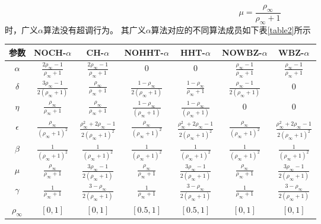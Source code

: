 \begin{equation}
\mu=\frac{\rho_{\infty}}{\rho_{\infty}+1}
\end{equation}
时，广义$\alpha$算法没有超调行为。
{}
其广义$\alpha$算法对应的不同算法成员如下表\ref{table2}所示
\begin{table}[htbp]
\vspace{0.5em}\centering\wuhao
\begin{tabular}{ccccccc}
\toprule[1.5pt]
参数 & NOCH-$\alpha$ & CH-$\alpha$ & NOHHT-$\alpha$ & HHT-$\alpha$ & NOWBZ-$\alpha$ & WBZ-$\alpha$\\
\midrule[1pt]
$\alpha$ & $\frac{2\rho_{\infty}-1}{\rho_{\infty}+1}$ & $\frac{2\rho_{\infty}-1}{\rho_{\infty}+1}$ & $0$ & $0$ & $\frac{\rho_{\infty}-1}{\rho_{\infty}+1}$ & $\frac{\rho_{\infty}-1}{\rho_{\infty}+1}$\\ [0.5em]
$\delta$ & $\frac{3\rho_{\infty}-1}{2(\rho_{\infty}+1)}$ & $\frac{\rho_{\infty}}{\rho_{\infty}+1}$ & $\frac{1-\rho_{\infty}}{2(\rho_{\infty}+1)}$ & $\frac{1-\rho_{\infty}}{\rho_{\infty}+1}$ & $\frac{\rho_{\infty}-1}{2(\rho_{\infty}+1)}$ & $0$\\ [0.5em]
$\eta$ & $\frac{\rho_{\infty}}{\rho_{\infty}+1}$ & $\frac{\rho_{\infty}}{\rho_{\infty}+1}$ & $\frac{1-\rho_{\infty}}{(\rho_{\infty}+1)}$ & $\frac{1-\rho_{\infty}}{(\rho_{\infty}+1)}$ & $0$ & $0$\\ [0.5em]
$\epsilon$ & $\frac{\rho_{\infty}}{(\rho_{\infty}+1)^2}$ & $\frac{\rho_{\infty}^2+2\rho_{\infty}-1}{2(\rho_{\infty}+1)^2}$ & $\frac{\rho_{\infty}}{(\rho_{\infty}+1)^2}$ & $\frac{\rho_{\infty}^2+2\rho_{\infty}-1}{2(\rho_{\infty}+1)^2}$ & $\frac{\rho_{\infty}}{(\rho_{\infty}+1)^2}$ & $\frac{\rho_{\infty}^2+2\rho_{\infty}-1}{2(\rho_{\infty}+1)^2}$\\ [0.5em]
$\beta$ & $\frac{1}{(\rho_{\infty}+1)^2}$ & $\frac{1}{(\rho_{\infty}+1)^2}$ & $\frac{1}{(\rho_{\infty}+1)^2}$ & $\frac{1}{(\rho_{\infty}+1)^2}$ & $\frac{1}{(\rho_{\infty}+1)^2}$ & $\frac{1}{(\rho_{\infty}+1)^2}$\\ [0.5em]
$\mu$ & $\frac{\rho_{\infty}}{\rho_{\infty}+1}$ & $\frac{3\rho_{\infty}-1}{2(\rho_{\infty}+1)}$ & $\frac{\rho_{\infty}}{\rho_{\infty}+1}$ & $\frac{3\rho_{\infty}-1}{2(\rho_{\infty}+1)}$ & $\frac{\rho_{\infty}}{\rho_{\infty}+1}$ & $\frac{3\rho_{\infty}-1}{2(\rho_{\infty}+1)}$\\ [0.5em]
$\gamma$ & $\frac{1}{\rho_{\infty}+1}$ & $\frac{3-\rho_{\infty}}{2(\rho_{\infty}+1)}$ & $\frac{1}{\rho_{\infty}+1}$ & $\frac{3-\rho_{\infty}}{2(\rho_{\infty}+1)}$ & $\frac{1}{\rho_{\infty}+1}$ & $\frac{3-\rho_{\infty}}{2(\rho_{\infty}+1)}$\\ [0.5em]
$\rho_{\infty}$ & $[0,1]$ & $[0,1]$ & $[0.5,1]$ & $[0.5,1]$ & $[0,1]$ & $[0,1]$\\
\bottomrule[1.5pt]
\end{tabular}
\end{table}

